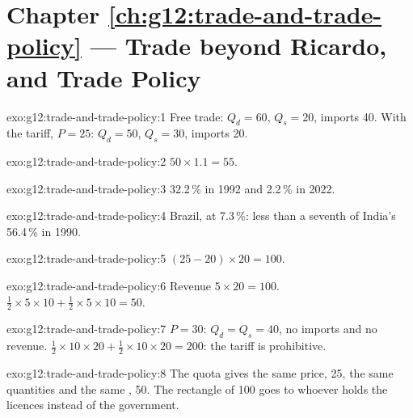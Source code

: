 \section*{Chapter \ref{ch:g12:trade-and-trade-policy} --- Trade beyond Ricardo, and Trade Policy}

\begin{solution}{exo:g12:trade-and-trade-policy:1}
Free trade: $Q_d = 60$, $Q_s = 20$, imports 40. With the tariff, $P = 25$: $Q_d = 50$, $Q_s = 30$, imports 20.
\end{solution}

\begin{solution}{exo:g12:trade-and-trade-policy:2}
$50 \times 1.1 = 55$.
\end{solution}

\begin{solution}{exo:g12:trade-and-trade-policy:3}
32.2\,\% in 1992 and 2.2\,\% in 2022.
\end{solution}

\begin{solution}{exo:g12:trade-and-trade-policy:4}
Brazil, at 7.3\,\%: less than a seventh of India's 56.4\,\% in 1990.
\end{solution}

\begin{solution}{exo:g12:trade-and-trade-policy:5}
$(25 - 20) \times 20 = 100$.
\end{solution}

\begin{solution}{exo:g12:trade-and-trade-policy:6}
Revenue $5 \times 20 = 100$.  $\tfrac12 \times 5 \times 10 + \tfrac12 \times 5 \times 10 = 50$.
\end{solution}

\begin{solution}{exo:g12:trade-and-trade-policy:7}
$P = 30$: $Q_d = Q_s = 40$, no imports and no revenue.  $\tfrac12 \times 10 \times 20 + \tfrac12 \times 10 \times 20 = 200$: the tariff is prohibitive.
\end{solution}

\begin{solution}{exo:g12:trade-and-trade-policy:8}
The quota gives the same price, 25, the same quantities and the same , 50. The rectangle of 100 goes to whoever holds the licences instead of the government.
\end{solution}

